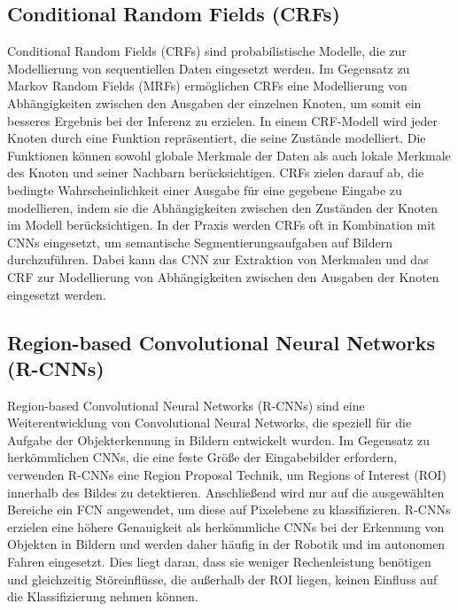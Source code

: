\subsection{Conditional Random Fields (CRFs)}
Conditional Random Fields (CRFs) sind probabilistische Modelle, die zur
Modellierung von sequentiellen Daten eingesetzt werden. Im Gegensatz zu Markov
Random Fields (MRFs) ermöglichen CRFs eine Modellierung von Abhängigkeiten
zwischen den Ausgaben der einzelnen Knoten, um somit ein besseres Ergebnis bei
der Inferenz zu erzielen. In einem CRF-Modell wird jeder Knoten durch eine
Funktion repräsentiert, die seine Zustände modelliert. Die Funktionen können
sowohl globale Merkmale der Daten als auch lokale Merkmale des Knoten und
seiner Nachbarn berücksichtigen. CRFs zielen darauf ab, die bedingte
Wahrscheinlichkeit einer Ausgabe für eine gegebene Eingabe zu modellieren,
indem sie die Abhängigkeiten zwischen den Zuständen der Knoten im Modell
berücksichtigen. In der Praxis werden CRFs oft in Kombination mit CNNs
eingesetzt, um semantische Segmentierungsaufgaben auf Bildern durchzuführen.
Dabei kann das CNN zur Extraktion von Merkmalen und das CRF zur Modellierung
von Abhängigkeiten zwischen den Ausgaben der Knoten eingesetzt werden.

\subsection{Region-based Convolutional Neural Networks (R-CNNs)}
Region-based Convolutional Neural Networks (R-CNNs) sind eine Weiterentwicklung
von Convolutional Neural Networks, die speziell für die Aufgabe der
Objekterkennung in Bildern entwickelt wurden. Im Gegensatz zu herkömmlichen
CNNs, die eine feste Größe der Eingabebilder erfordern, verwenden R-CNNs eine
Region Proposal Technik, um Regions of Interest (ROI) innerhalb des Bildes zu
detektieren. Anschließend wird nur auf die ausgewählten Bereiche ein FCN
angewendet, um diese auf Pixelebene zu klassifizieren. R-CNNs erzielen eine
höhere Genauigkeit als herkömmliche CNNs bei der Erkennung von Objekten in
Bildern und werden daher häufig in der Robotik und im autonomen Fahren
eingesetzt. Dies liegt daran, dass sie weniger Rechenleistung benötigen und
gleichzeitig Störeinflüsse, die außerhalb der ROI liegen, keinen Einfluss auf
die Klassifizierung nehmen können. \cite{8237548}

